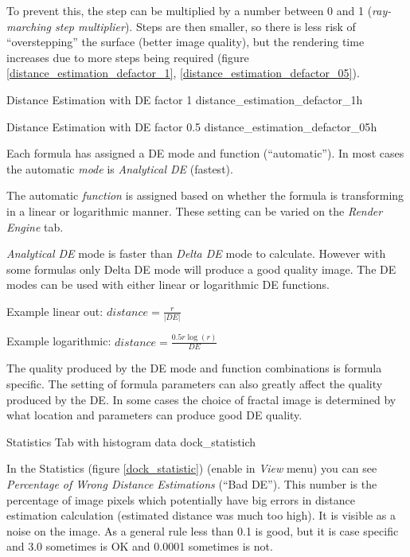 To prevent this, the step can be multiplied by a number between 0 and 1 (\emph{ray-marching step multiplier}). Steps are then smaller, so there is less risk of ``overstepping'' the surface (better image quality), but the rendering time increases due to more steps being required (figure \ref{distance_estimation_defactor_1}, \ref{distance_estimation_defactor_05}).

{Distance Estimation with DE factor 1}
{distance_estimation_defactor_1}{h}

{Distance Estimation with DE factor 0.5}
{distance_estimation_defactor_05}{h}

Each formula has assigned a DE mode and function (``automatic''). In most cases
the automatic \emph{mode} is \emph{Analytical DE} (fastest).

The automatic \emph{function} is assigned based on whether the formula is
transforming in a linear or logarithmic manner. These setting can be varied on
the \emph{Render Engine} tab.

\emph{Analytical DE} mode is faster than \emph{Delta DE} mode to calculate.
However with some formulas only Delta DE mode will produce a good quality image.
The DE modes can be used with either linear or logarithmic DE functions.

Example linear out: $ distance = \frac{r}{\lvert DE \rvert} $

Example logarithmic: $ distance = \frac{0.5 r  \log(r)}{DE} $

The quality produced by the DE mode and function combinations is formula
specific. The setting of formula parameters can also greatly affect the quality
produced by the DE. In some cases the choice of fractal image is determined by
what location and parameters can produce good DE quality.

\nopagebreak

{Statistics Tab with histogram data}
{dock_statistic}{h}

In the Statistics (figure \ref{dock_statistic}) (enable in \emph{View} menu) you can see \emph{Percentage of
	Wrong Distance Estimations} (``Bad DE''). This number is the percentage of image
pixels which potentially have big errors in distance estimation calculation
(estimated distance was much too high). It is visible as a noise on the image.
As a general rule less than 0.1 is good, but it is case specific and 3.0
sometimes is OK and 0.0001 sometimes is not.

